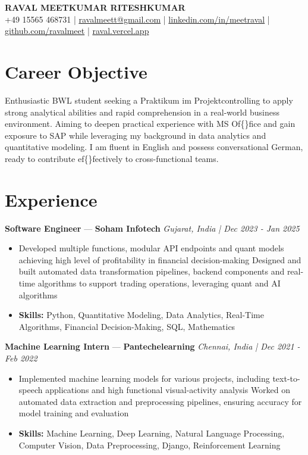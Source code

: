 \documentclass[a4paper,10pt]{article}
\begin{document}
\begin{center}
  {\Large\bfseries RAVAL MEETKUMAR RITESHKUMAR}\\[2pt]
  {\small +49 15565 468731 \;|\; \href{mailto:ravalmeett@gmail.com}{ravalmeett@gmail.com} \;|\; \href{https://www.linkedin.com/in/meetraval/}{linkedin.com/in/meetraval} \;|\; \href{https://github.com/ravalmeet}{github.com/ravalmeet} \;|\; \href{https://raval.vercel.app/}{raval.vercel.app}}
\end{center}
\vspace{-3pt}

\section*{Career Objective}
Enthusiastic BWL student seeking a Praktikum im Projektcontrolling to apply strong analytical abilities and rapid comprehension in a real-world business environment. Aiming to deepen practical experience with MS Of\{\}fice and gain exposure to SAP while leveraging my background in data analytics and quantitative modeling. I am fluent in English and possess conversational German, ready to contribute ef\{\}fectively to cross-functional teams.\par

\section*{Experience}
\textbf{Software Engineer} — \textbf{Soham Infotech} \hfill \textit{Gujarat, India \;|\; Dec 2023 - Jan 2025}\par
\vspace{1pt}
\begin{itemize}
  \item Developed multiple functions, modular API endpoints and quant models achieving high level of profitability in financial decision-making Designed and built automated data transformation pipelines, backend components and real-time algorithms to support trading operations, leveraging quant and AI algorithms
  \item \textbf{Skills:} Python, Quantitative Modeling, Data Analytics, Real-Time Algorithms, Financial Decision-Making, SQL, Mathematics
\end{itemize}
\vspace{3pt}
\textbf{Machine Learning Intern} — \textbf{Pantechelearning} \hfill \textit{Chennai, India \;|\; Dec 2021 - Feb 2022}\par
\vspace{1pt}
\begin{itemize}
  \item Implemented machine learning models for various projects, including text-to-speech applications and high functional visual-activity analysis Worked on automated data extraction and preprocessing pipelines, ensuring accuracy for model training and evaluation
  \item \textbf{Skills:} Machine Learning, Deep Learning, Natural Language Processing, Computer Vision, Data Preprocessing, Django, Reinforcement Learning
\end{itemize}
\end{document}
